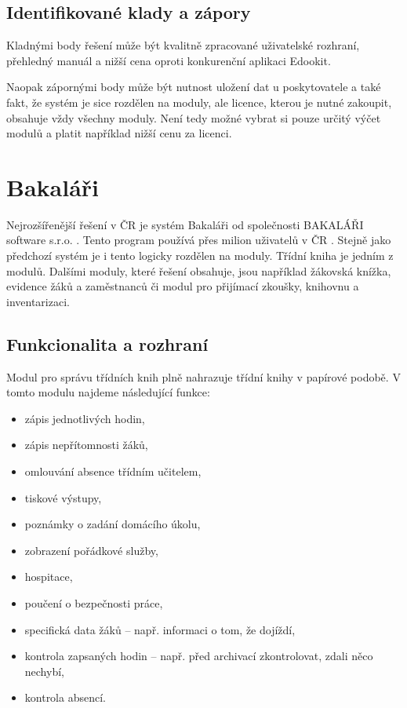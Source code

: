 \subsection{Identifikované klady a zápory}
Kladnými body řešení může být kvalitně zpracované uživatelské rozhraní, přehledný manuál a nižší cena oproti konkurenční aplikaci Edookit.

Naopak zápornými body může být nutnost uložení dat u poskytovatele a také fakt, že systém je sice rozdělen na moduly, ale licence, kterou je nutné zakoupit, obsahuje vždy všechny moduly. Není tedy možné vybrat si pouze určitý výčet modulů a platit například nižší cenu za licenci.

\section{Bakaláři}
Nejrozšířenější řešení v ČR je systém Bakaláři od společnosti BAKALÁŘI software s.r.o. \cite{bakalari}. Tento program používá přes milion uživatelů v ČR \cite{bakalari}. Stejně jako předchozí systém je i tento logicky rozdělen na moduly. Třídní kniha je jedním z modulů. Dalšími moduly, které řešení obsahuje, jsou například žákovská knížka, evidence žáků a zaměstnanců či modul pro přijímací zkoušky, knihovnu a inventarizaci.

\subsection{Funkcionalita a rozhraní}
Modul pro správu třídních knih plně nahrazuje třídní knihy v papírové podobě. V tomto modulu najdeme následující funkce:

\begin{itemize}
    \item zápis jednotlivých hodin,
    \item zápis nepřítomnosti žáků,
    \item omlouvání absence třídním učitelem,
    \item tiskové výstupy,
    \item poznámky o zadání domácího úkolu,
    \item zobrazení pořádkové služby,
    \item hospitace,
    \item poučení o bezpečnosti práce,
    \item specifická data žáků -- např. informaci o tom, že dojíždí,
    \item kontrola zapsaných hodin -- např. před archivací zkontrolovat, zdali něco nechybí,
    \item kontrola absencí.
\end{itemize}

